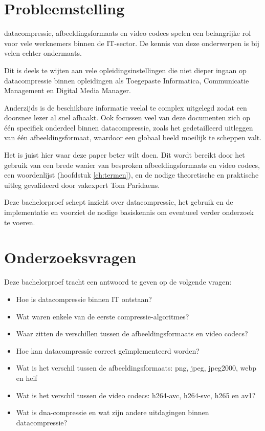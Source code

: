 \section{Probleemstelling}
\label{sec:probleemstelling}
\Gls{datacompressie}, \glspl{afbeeldingsformaat} en video \glspl{codec} spelen een belangrijke rol voor vele werknemers binnen de IT-sector. De kennis van deze onderwerpen is bij velen echter ondermaats. 

Dit is deels te wijten aan vele opleidingsinstellingen die niet dieper ingaan op \gls{datacompressie} binnen opleidingen als Toegepaste Informatica, Communicatie Management en Digital Media Manager.

Anderzijds is de beschikbare informatie veelal te complex uitgelegd zodat een doorsnee lezer al snel afhaakt. Ook focussen veel van deze documenten zich op één specifiek onderdeel binnen \gls{datacompressie}, zoals het gedetailleerd uitleggen van één \gls{afbeeldingsformaat}, waardoor een globaal beeld moeilijk te scheppen valt.

Het is juist hier waar deze paper beter wilt doen. Dit wordt bereikt door het gebruik van een brede waaier van besproken \glspl{afbeeldingsformaat} en video \glspl{codec}, een woordenlijst (hoofdstuk \ref{ch:termen}), en de nodige theoretische en praktische uitleg gevalideerd door vakexpert Tom Paridaens.

Deze bachelorproef schept inzicht over \gls{datacompressie}, het gebruik en de implementatie en voorziet de nodige basiskennis om eventueel verder onderzoek te voeren.

\section{Onderzoeksvragen}
\label{sec:onderzoeksvragen}
Deze bachelorproef tracht een antwoord te geven op de volgende vragen: 
\begin{itemize}
	\item Hoe is \gls{datacompressie} binnen IT ontstaan?
	\item Wat waren enkele van de eerste \glspl{compressie-algoritme}?
	\item Waar zitten de verschillen tussen de \glspl{afbeeldingsformaat} en video \glspl{codec}?
	\item Hoe kan \gls{datacompressie} correct geïmplementeerd worden?
	\item Wat is het verschil tussen de \glspl{afbeeldingsformaat}: \gls{png}, \gls{jpeg}, \gls{jpeg2000}, \gls{webp} en \gls{heif}
	\item Wat is het verschil tussen de video \glspl{codec}: \gls{h264-avc}, \gls{h264-svc}, \gls{h265} en \gls{av1}?
	\item Wat is \gls{dna-compressie} en wat zijn andere uitdagingen binnen \gls{datacompressie}?
\end{itemize}

